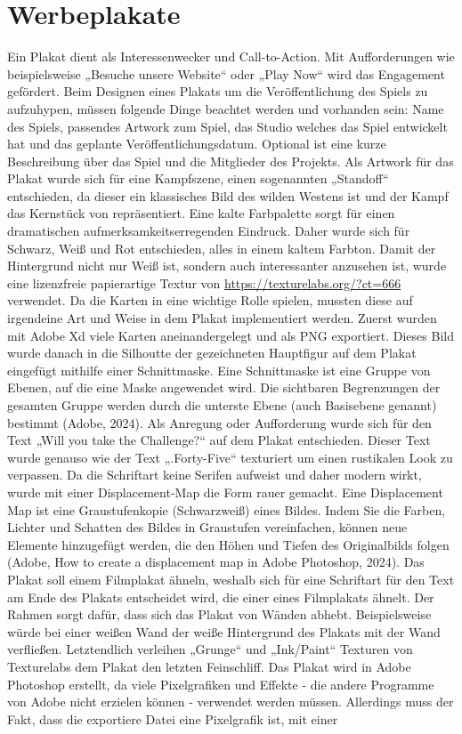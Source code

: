 
\section{Werbeplakate}\label{sec:trailer}

\renewcommand{\kapitelautor}{Autor: Markus Böheim}

Ein Plakat dient als Interessenwecker und Call-to-Action. Mit Aufforderungen wie beispielsweise „Besuche unsere Website“ oder „Play Now“ wird das Engagement gefördert. Beim Designen eines Plakats um die Veröffentlichung des Spiels zu aufzuhypen, müssen folgende Dinge beachtet werden und vorhanden sein: Name des Spiels, passendes Artwork zum Spiel, das Studio welches das Spiel entwickelt hat und das geplante Veröffentlichungsdatum. Optional ist eine kurze Beschreibung über das Spiel und die Mitglieder des Projekts.
Als Artwork für das Plakat wurde sich für eine Kampfszene, einen sogenannten „Standoff“ entschieden, da dieser ein klassisches Bild des wilden Westens ist und der Kampf das Kernstück von \FF repräsentiert. Eine kalte Farbpalette sorgt für einen dramatischen aufmerksamkeitserregenden Eindruck. Daher wurde sich für Schwarz, Weiß und Rot entschieden, alles in einem kaltem Farbton. Damit der Hintergrund nicht nur Weiß ist, sondern auch interessanter anzusehen ist, wurde eine lizenzfreie papierartige Textur von \url{https://texturelabs.org/?ct=666} verwendet. Da die Karten in \FF eine wichtige Rolle spielen, mussten diese auf irgendeine Art und Weise in dem Plakat implementiert werden. Zuerst wurden mit Adobe Xd viele Karten aneinandergelegt und als PNG exportiert. Dieses Bild wurde danach in die Silhoutte der gezeichneten Hauptfigur auf dem Plakat eingefügt mithilfe einer Schnittmaske. Eine Schnittmaske ist eine Gruppe von Ebenen, auf die eine Maske angewendet wird. Die sichtbaren Begrenzungen der gesamten Gruppe werden durch die unterste Ebene (auch Basisebene genannt) bestimmt (Adobe, 2024). Als Anregung oder Aufforderung wurde sich für den Text „Will you take the Challenge?“ auf dem Plakat entschieden. Dieser Text wurde genauso wie der Text „.Forty-Five“ texturiert um einen rustikalen Look zu verpassen. Da die Schriftart keine Serifen aufweist und daher modern wirkt, wurde mit einer Displacement-Map die Form rauer gemacht. Eine Displacement Map ist eine Graustufenkopie (Schwarzweiß) eines Bildes. Indem Sie die Farben, Lichter und Schatten des Bildes in Graustufen vereinfachen, können neue Elemente hinzugefügt werden, die den Höhen und Tiefen des Originalbilds folgen (Adobe, How to create a displacement map in Adobe Photoshop, 2024). Das Plakat soll einem Filmplakat ähneln, weshalb sich für eine Schriftart für den Text am Ende des Plakats entscheidet wird, die einer eines Filmplakats ähnelt. Der Rahmen sorgt dafür, dass sich das Plakat von Wänden abhebt. Beispielsweise würde bei einer weißen Wand der weiße Hintergrund des Plakats mit der Wand verfließen. Letztendlich verleihen „Grunge“ und „Ink/Paint“ Texturen von Texturelabs dem Plakat den letzten Feinschliff. Das Plakat wird in Adobe Photoshop erstellt, da viele Pixelgrafiken und Effekte - die andere Programme von Adobe nicht erzielen können - verwendet werden müssen. Allerdings muss der Fakt, dass die exportiere Datei eine Pixelgrafik ist, mit einer 